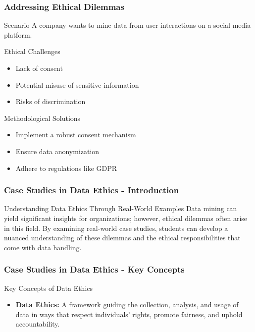 \documentclass[aspectratio=169]{beamer}
\begin{document}
\begin{frame}[fragile]
    \frametitle{Addressing Ethical Dilemmas}
    \begin{block}{Scenario}
        A company wants to mine data from user interactions on a social media platform.
    \end{block}
    \begin{block}{Ethical Challenges}
        \begin{itemize}
            \item Lack of consent
            \item Potential misuse of sensitive information
            \item Risks of discrimination
        \end{itemize}
    \end{block}
    \begin{block}{Methodological Solutions}
        \begin{itemize}
            \item Implement a robust consent mechanism
            \item Ensure data anonymization
            \item Adhere to regulations like GDPR
        \end{itemize}
    \end{block}
\end{frame}

\begin{frame}[fragile]
    \frametitle{Case Studies in Data Ethics - Introduction}
    \begin{block}{Understanding Data Ethics Through Real-World Examples}
        Data mining can yield significant insights for organizations; however, ethical dilemmas often arise in this field. By examining real-world case studies, students can develop a nuanced understanding of these dilemmas and the ethical responsibilities that come with data handling.
    \end{block}
\end{frame}

\begin{frame}[fragile]
    \frametitle{Case Studies in Data Ethics - Key Concepts}
    \begin{block}{Key Concepts of Data Ethics}
        \begin{itemize}
            \item \textbf{Data Ethics:} A framework guiding the collection, analysis, and usage of data in ways that respect individuals' rights, promote fairness, and uphold accountability.
        \end{itemize}
    \end{block}
\end{frame}
\end{document}
